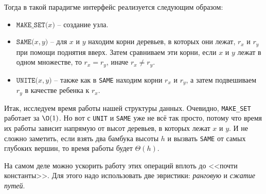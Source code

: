 Тогда в такой парадигме интерфейс реализуется следующим образом:
\begin{itemize}
    \item $\texttt{MAKE\_SET(}x\texttt{)}$ -- создание узла.
    \item $\texttt{SAME(}x, y\texttt{)}$ -- для $x$ и $y$ находим корни деревьев, в которых они лежат, $r_x$ и $r_y$ при помощи поднятия вверх. Затем сравниваем эти корни, если $x$ и $y$ лежат в одном множестве, то $r_x = r_y$, иначе $r_x \neq r_y$.
    \item $\texttt{UNITE(}x, y\texttt{)}$ -- также как в \texttt{SAME} находим корни $r_x$ и $r_y$, а затем подвешиваем $r_y$ в качестве ребенка к $r_x$.
\end{itemize}

Итак, исследуем время работы нашей структуры данных. Очевидно, \texttt{MAKE\_SET} работает за $\O(1)$.
Но вот с \texttt{UNIT} и \texttt{SAME} уже не всё так просто, потому что время их работы зависит напрямую от высот деревьев, в которых лежат $x$ и $y$.
И не сложно заметить, если взять два бамбука высоты $h$ и вызвать \texttt{SAME} от самых глубоких вершин, то время работы будет $\Theta(h)$.

На самом деле можно ускорить работу этих операций вплоть до <<почти константы>>. Для этого надо использовать две эвристики: \textit{ранговую} и \textit{сжатие путей}.
